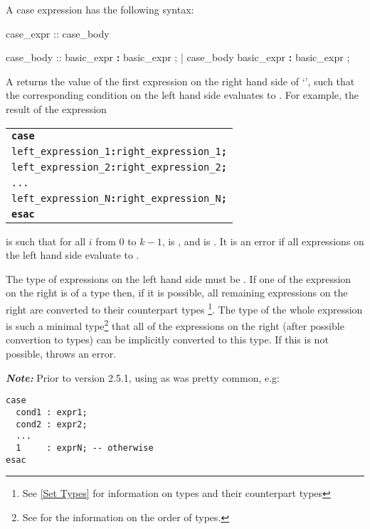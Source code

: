 A case expression has the following syntax:
%
\begin{Grammar}
case_expr ::  case_body 

case_body ::
        basic_expr \textbf{:} basic_expr {;}
      | case_body basic_expr \textbf{:} basic_expr {;}
\end{Grammar}

\noindent A  returns the value of the first
expression on the right hand side of `\code{:}', such that the
corresponding condition on the left hand side evaluates to
.
%
For example, the result of the expression
\begin{alltt}
\begin{tabular}{l}
\textbf{case}\\
 left_expression_1 \textbf{:} right_expression_1 \textbf{;}\\
 left_expression_2 \textbf{:} right_expression_2 \textbf{;}\\
 ...\\
 left_expression_N \textbf{:} right_expression_N \textbf{;}\\
\textbf{esac}
\end{tabular}
\end{alltt}

\noindent is  such that for all $i$ from
$0$ to $k-1$,  is , and
 is .
%
It is an error if all expressions on the left hand side evaluate
to .

The type of expressions on the left hand side must be \Boolean.  If
one of the expression on the right is of a \Set type then, if it is
possible, all remaining expressions on the right are converted to
their counterpart \Set types \footnote{See \ref{Set Types} for
information on \Set types and their counterpart types}. The type of
the whole expression is such a minimal type\footnote{See  for the information on the order of types.} that all of the
expressions on the right (after possible convertion to \Set types) can
be implicitly converted to this type.
%
If this is not possible, \nusmv throws an error.

\bigskip
\textbf{\textit{Note:}}
\label{ref::caseconditionexample}
Prior to version 2.5.1, using 
as  was pretty common, e.g:
\begin{verbatim}
case 
  cond1 : expr1;
  cond2 : expr2;
  ...
  1     : exprN; -- otherwise
esac
\end{verbatim}

